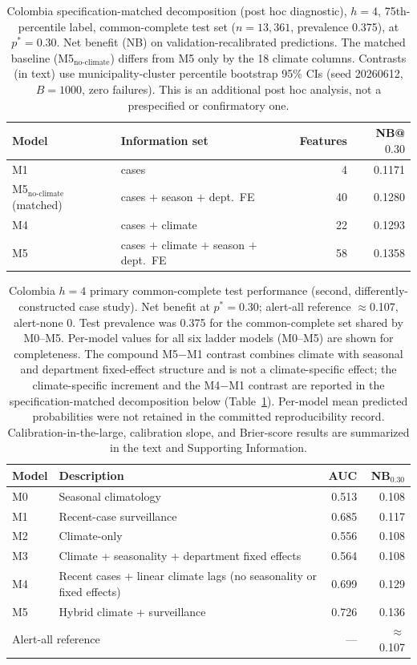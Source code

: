 \documentclass[11pt,a4paper]{article}
\begin{document}
\begin{table}[H]
\centering
\caption{Colombia specification-matched decomposition (post hoc diagnostic), $h=4$, 75th-percentile label, common-complete test set ($n=13{,}361$, prevalence 0.375), at $p^*=0.30$. Net benefit (NB) on validation-recalibrated predictions. The matched baseline (M5$_{\text{no-climate}}$) differs from M5 only by the 18 climate columns. Contrasts (in text) use municipality-cluster percentile bootstrap 95\% CIs (seed 20260612, $B=1000$, zero failures). This is an additional post hoc analysis, not a prespecified or confirmatory one.}
\label{tab:matcheddecomp}
\begin{tabular}{llrr}
\toprule
Model & Information set & Features & NB@$0.30$ \\
\midrule
M1 & cases & 4 & 0.1171 \\
M5$_{\text{no-climate}}$ (matched) & cases $+$ season $+$ dept.\ FE & 40 & 0.1280 \\
M4 & cases $+$ climate & 22 & 0.1293 \\
M5 & cases $+$ climate $+$ season $+$ dept.\ FE & 58 & 0.1358 \\
\bottomrule
\end{tabular}
\end{table}

\begin{table}[htbp]
\centering
\caption{Colombia $h=4$ primary common-complete test performance (second, differently-constructed case study). Net benefit at $p^*=0.30$; alert-all reference $\approx$0.107, alert-none $0$. Test prevalence was 0.375 for the common-complete set shared by M0--M5. Per-model values for all six ladder models (M0--M5) are shown for completeness. The compound M5$-$M1 contrast combines climate with seasonal and department fixed-effect structure and is not a climate-specific effect; the climate-specific increment and the M4$-$M1 contrast are reported in the specification-matched decomposition below (Table~\ref{tab:matcheddecomp}). Per-model mean predicted probabilities were not retained in the committed reproducibility record. Calibration-in-the-large, calibration slope, and Brier-score results are summarized in the text and Supporting Information.}
\label{tab:colombia}
\small
\begin{tabular}{llrr}
\toprule
Model & Description & AUC & NB$_{0.30}$ \\
\midrule
M0 & Seasonal climatology & 0.513 & 0.108 \\
M1 & Recent-case surveillance & 0.685 & 0.117 \\
M2 & Climate-only & 0.556 & 0.108 \\
M3 & Climate + seasonality + department fixed effects & 0.564 & 0.108 \\
M4 & Recent cases + linear climate lags (no seasonality or fixed effects) & 0.699 & 0.129 \\
M5 & Hybrid climate + surveillance & 0.726 & 0.136 \\
\midrule
\multicolumn{2}{l}{Alert-all reference} & --- & $\approx$0.107 \\
\bottomrule
\end{tabular}
\end{table}
\end{document}
